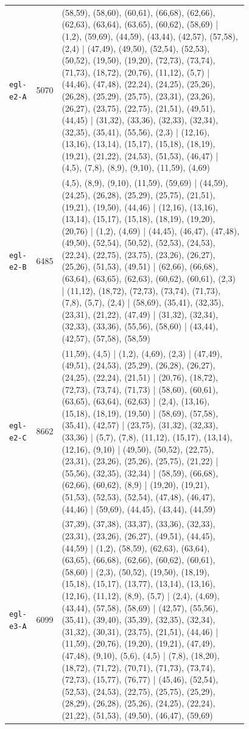 \begin{landscape}
\begin{longtable}{lr>{\tiny\raggedright\arraybackslash}p{0.78\linewidth}}
\texttt{egl-e2-A} & 5070 & (58,59), (58,60), (60,61), (66,68), (62,66), (62,63), (63,64), (63,65), (60,62), (58,69) | (1,2), (59,69), (44,59), (43,44), (42,57), (57,58), (2,4) | (47,49), (49,50), (52,54), (52,53), (50,52), (19,50), (19,20), (72,73), (73,74), (71,73), (18,72), (20,76), (11,12), (5,7) | (44,46), (47,48), (22,24), (24,25), (25,26), (26,28), (25,29), (25,75), (23,31), (23,26), (26,27), (23,75), (22,75), (21,51), (49,51), (44,45) | (31,32), (33,36), (32,33), (32,34), (32,35), (35,41), (55,56), (2,3) | (12,16), (13,16), (13,14), (15,17), (15,18), (18,19), (19,21), (21,22), (24,53), (51,53), (46,47) | (4,5), (7,8), (8,9), (9,10), (11,59), (4,69) \\[2pt]
\texttt{egl-e2-B} & 6485 & (4,5), (8,9), (9,10), (11,59), (59,69) | (44,59), (24,25), (26,28), (25,29), (25,75), (21,51), (19,21), (19,50), (44,46) | (12,16), (13,16), (13,14), (15,17), (15,18), (18,19), (19,20), (20,76) | (1,2), (4,69) | (44,45), (46,47), (47,48), (49,50), (52,54), (50,52), (52,53), (24,53), (22,24), (22,75), (23,75), (23,26), (26,27), (25,26), (51,53), (49,51) | (62,66), (66,68), (63,64), (63,65), (62,63), (60,62), (60,61), (2,3) | (11,12), (18,72), (72,73), (73,74), (71,73), (7,8), (5,7), (2,4) | (58,69), (35,41), (32,35), (23,31), (21,22), (47,49) | (31,32), (32,34), (32,33), (33,36), (55,56), (58,60) | (43,44), (42,57), (57,58), (58,59) \\[2pt]
\texttt{egl-e2-C} & 8662 & (11,59), (4,5) | (1,2), (4,69), (2,3) | (47,49), (49,51), (24,53), (25,29), (26,28), (26,27), (24,25), (22,24), (21,51) | (20,76), (18,72), (72,73), (73,74), (71,73) | (58,60), (60,61), (63,65), (63,64), (62,63) | (2,4), (13,16), (15,18), (18,19), (19,50) | (58,69), (57,58), (35,41), (42,57) | (23,75), (31,32), (32,33), (33,36) | (5,7), (7,8), (11,12), (15,17), (13,14), (12,16), (9,10) | (49,50), (50,52), (22,75), (23,31), (23,26), (25,26), (25,75), (21,22) | (55,56), (32,35), (32,34) | (58,59), (66,68), (62,66), (60,62), (8,9) | (19,20), (19,21), (51,53), (52,53), (52,54), (47,48), (46,47), (44,46) | (59,69), (44,45), (43,44), (44,59) \\[2pt]
\texttt{egl-e3-A} & 6099 & (37,39), (37,38), (33,37), (33,36), (32,33), (23,31), (23,26), (26,27), (49,51), (44,45), (44,59) | (1,2), (58,59), (62,63), (63,64), (63,65), (66,68), (62,66), (60,62), (60,61), (58,60) | (2,3), (50,52), (19,50), (18,19), (15,18), (15,17), (13,77), (13,14), (13,16), (12,16), (11,12), (8,9), (5,7) | (2,4), (4,69), (43,44), (57,58), (58,69) | (42,57), (55,56), (35,41), (39,40), (35,39), (32,35), (32,34), (31,32), (30,31), (23,75), (21,51), (44,46) | (11,59), (20,76), (19,20), (19,21), (47,49), (47,48), (9,10), (5,6), (4,5) | (7,8), (18,20), (18,72), (71,72), (70,71), (71,73), (73,74), (72,73), (15,77), (76,77) | (45,46), (52,54), (52,53), (24,53), (22,75), (25,75), (25,29), (28,29), (26,28), (25,26), (24,25), (22,24), (21,22), (51,53), (49,50), (46,47), (59,69) \\[2pt]

\end{longtable}
\end{landscape}
